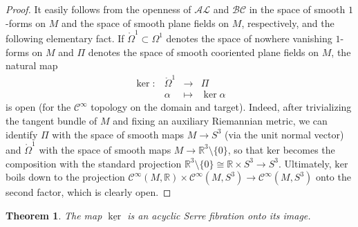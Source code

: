 \documentclass[letterpaper, 11pt]{article}
\numberwithin{equation}{section}
\newtheorem{thm}{Theorem}[section]
\newcommand{\R}{\mathbb{R}}
\begin{document}
\begin{proof}
It easily follows from the openness of $\mathcal{AL}$ and $\mathcal{BC}$ in the space of smooth $1$-forms on $M$ and the space of smooth plane fields on $M$, respectively, and the following elementary fact. If $\mathring{\Omega}^1 \subset \Omega^1$ denotes the space of nowhere vanishing $1$-forms on $M$ and $\Pi$ denotes the space of smooth cooriented plane fields on $M$, the natural map 
$$ \begin{array}{rccc}
\ker : & \mathring{\Omega}^1 & \longrightarrow & \Pi \\
& \alpha & \longmapsto & \ker \alpha
\end{array}$$
is open (for the $\mathcal{C}^\infty$ topology on the domain and target). Indeed, after trivializing the tangent bundle of $M$ and fixing an auxiliary Riemannian metric, we can identify $\Pi$ with the space of smooth maps $M \rightarrow S^3$ (via the unit normal vector) and $\mathring{\Omega}^1$ with the space of smooth maps $M \rightarrow \R^3 \setminus \{0\}$, so that $\mathrm{ker}$ becomes the composition with the standard projection $\R^3 \setminus \{0\} \cong \R \times S^3 \rightarrow S^3$. Ultimately, $\mathrm{ker}$ boils down to the projection $\mathcal{C}^\infty(M, \R) \times \mathcal{C}^\infty(M, S^3) \rightarrow \mathcal{C}^\infty(M, S^3)$ onto the second factor, which is clearly open.
\end{proof}

\begin{thm} \label{thm:hominc}
The map $\underline{\ker}$ is an acyclic Serre fibration onto its image.
\end{thm}
\end{document}
